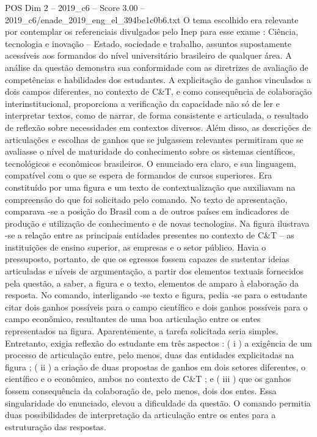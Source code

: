 \begin{textsample}{POS Dim 2 – 2019\_c6 – Score 3.00 – 2019\_c6/enade\_2019\_eng\_el\_394be1c0b6.txt}
O tema escolhido era relevante por contemplar os referenciais divulgados pelo Inep para esse exame : Ciência, tecnologia e inovação – Estado, sociedade e trabalho, assuntos supostamente acessíveis aos formandos do nível universitário brasileiro de qualquer área.
A análise da questão demonstra sua conformidade com as diretrizes de avaliação de competências e habilidades dos estudantes.
A explicitação de ganhos vinculados a dois campos diferentes, no contexto de C\&T, e como consequência de colaboração interinstitucional, proporciona a verificação da capacidade não só de ler e interpretar textos, como de narrar, de forma consistente e articulada, o resultado de reflexão sobre necessidades em contextos diversos.
Além disso, as descrições de articulações e escolhas de ganhos que se julgassem relevantes permitiram que se avaliasse o nível de maturidade do conhecimento sobre os sistemas científicos, tecnológicos e econômicos brasileiros.
O enunciado era claro, e sua linguagem, compatível com o que se espera de formandos de cursos superiores.
Era constituído por uma figura e um texto de contextualização que auxiliavam na compreensão do que foi solicitado pelo comando.
No texto de apresentação, comparava -se a posição do Brasil com a de outros países em indicadores de produção e utilização de conhecimento e de novas tecnologias.
Na figura ilustrava -se a relação entre as principais entidades presentes no contexto de C\&T – as instituições de ensino superior, as empresas e o setor público.
Havia o pressuposto, portanto, de que os egressos fossem capazes de sustentar ideias articuladas e níveis de argumentação, a partir dos elementos textuais fornecidos pela questão, a saber, a figura e o texto, elementos de amparo à elaboração da resposta.
No comando, interligando -se texto e figura, pedia -se para o estudante citar dois ganhos possíveis para o campo científico e dois ganhos possíveis para o campo econômico, resultantes de uma boa articulação entre os entes representados na figura.
Aparentemente, a tarefa solicitada seria simples.
Entretanto, exigia reflexão do estudante em três aspectos : ( i ) a exigência de um processo de articulação entre, pelo menos, duas das entidades explicitadas na figura ; ( ii ) a criação de duas propostas de ganhos em dois setores diferentes, o científico e o econômico, ambos no contexto de C\&T ; e ( iii ) que os ganhos fossem consequência da colaboração de, pelo menos, dois dos entes.
Essa singularidade do enunciado, elevou a dificuldade da questão.
O comando permitia duas possibilidades de interpretação da articulação entre os entes para a estruturação das respostas.

\end{textsample}
